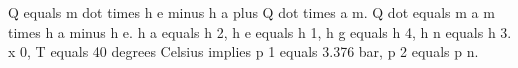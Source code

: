 Q equals m dot times h e minus h a plus Q dot times a m. Q dot equals m a m times h a minus h e. h a equals h 2, h e equals h 1, h g equals h 4, h n equals h 3. x 0, T equals 40 degrees Celsius implies p 1 equals 3.376 bar, p 2 equals p n.